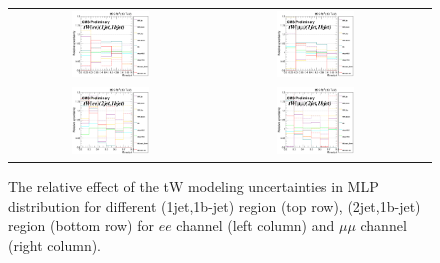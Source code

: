 \begin{figure}[ht]
  \begin{center}
    \begin{tabular}{ccc}
      \includegraphics[width=0.4\textwidth]{figures/tW/fig/Step2/uncertainties/ee/TW_Samples_H_MLP_1jet_1bjet_comb.png} &
      \includegraphics[width=0.4\textwidth]{figures/tW/fig/Step2/uncertainties/mumu/TW_Samples_H_MLP_1jet_1bjet_comb.png}\\
      \includegraphics[width=0.4\textwidth]{figures/tW/fig/Step2/uncertainties/ee/TW_Samples_H_MLP_2jet_1bjet_comb.png} &
      \includegraphics[width=0.4\textwidth]{figures/tW/fig/Step2/uncertainties/mumu/TW_Samples_H_MLP_2jet_1bjet_comb.png}\\
    \end{tabular}
    \caption{The relative effect of the tW modeling uncertainties in MLP distribution for different (1jet,1b-jet)  region (top row), (2jet,1b-jet) region (bottom row) for $ee$ channel (left column) and $\mu\mu$ channel (right column).
    \label{fig:uncert_TW}}
  \end{center}
\end{figure}

